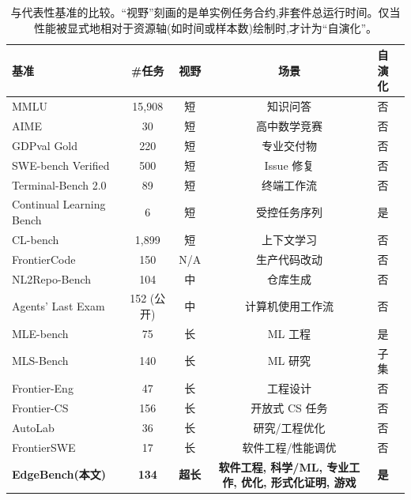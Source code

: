 \begin{table}[h]
\centering
\small
\setlength{\tabcolsep}{4pt}
\begin{tabular}{lcccl}
\toprule
\textbf{基准} & \textbf{\#任务} & \textbf{视野} & \textbf{场景} & \textbf{自演化} \\
\midrule
MMLU~\cite{hendrycks2021mmlu} & 15{,}908 & 短 & 知识问答 & 否 \\
AIME~\cite{maa2026aime} & 30 & 短 & 高中数学竞赛 & 否 \\
GDPval Gold~\cite{patwardhan2025gdpval} & 220 & 短 & 专业交付物 & 否 \\
SWE-bench Verified~\cite{jimenez2024swebench,openai2024swebench} & 500 & 短 & Issue 修复 & 否 \\
Terminal-Bench 2.0~\cite{merrill2026terminalbench} & 89 & 短 & 终端工作流 & 否 \\
Continual Learning Bench~\cite{asawa2026clbench} & 6 & 短 & 受控任务序列 & 是 \\
CL-bench~\cite{dou2026clbench} & 1{,}899 & 短 & 上下文学习 & 否 \\
FrontierCode~\cite{lu2026frontiercode} & 150 & N/A & 生产代码改动 & 否 \\
NL2Repo-Bench~\cite{ding2025nl2repo} & 104 & 中 & 仓库生成 & 否 \\
Agents' Last Exam~\cite{sun2026agents} & 152 (公开) & 中 & 计算机使用工作流 & 否 \\
MLE-bench~\cite{chan2025mle} & 75 & 长 & ML 工程 & 是 \\
MLS-Bench~\cite{lyu2026mlsbench} & 140 & 长 & ML 研究 & 子集 \\
Frontier-Eng~\cite{chi2026frontiereng} & 47 & 长 & 工程设计 & 否 \\
Frontier-CS~\cite{mang2025frontiercs} & 156 & 长 & 开放式 CS 任务 & 否 \\
AutoLab~\cite{xu2026autolab} & 36 & 长 & 研究/工程优化 & 否 \\
FrontierSWE~\cite{chu2026frontierswe} & 17 & 长 & 软件工程/性能调优 & 否 \\
\textbf{EdgeBench(本文)} & \textbf{134} & \textbf{超长} & \textbf{软件工程, 科学/ML, 专业工作, 优化, 形式化证明, 游戏} & \textbf{是} \\
\bottomrule
\end{tabular}
\caption{与代表性基准的比较。``视野''刻画的是单实例任务合约,非套件总运行时间。仅当性能被显式地相对于资源轴(如时间或样本数)绘制时,才计为``自演化''。}
\label{tab:bench-compare}
\end{table}

